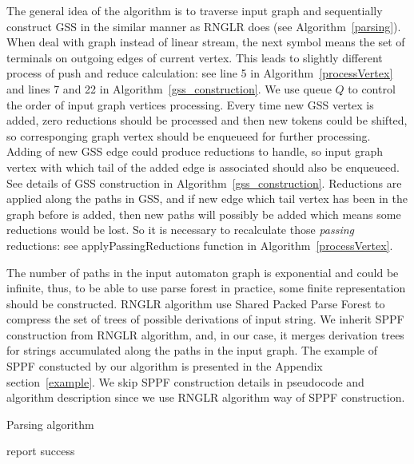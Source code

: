 The general idea of the algorithm is to traverse input graph and sequentially construct GSS
in the similar manner as RNGLR does (see Algorithm~\ref{parsing}). When deal with graph instead of linear stream,
the next symbol means the set of terminals on outgoing edges of current vertex.
This leads to slightly different process of push and reduce calculation: 
see line 5 in Algorithm~\ref{processVertex} and lines 7 and 22 in Algorithm~\ref{gss_construction}. 
We use queue $Q$ to control the order of input graph vertices processing. 
Every time new GSS vertex is added, zero reductions should be processed 
and then new tokens could be shifted, so corresponging graph vertex should be 
enqueueed for further processing. Adding of new GSS edge could produce reductions 
to handle, so input graph vertex with which tail of the added edge is associated should 
also be enqueueed. See details of GSS construction in Algorithm~\ref{gss_construction}. 
Reductions are applied along the paths in GSS, and if new edge 
which tail vertex has been in the graph before is added, then new paths will possibly 
be added which means some reductions would be lost. So it is necessary to recalculate 
those \emph{passing} reductions: see applyPassingReductions function in Algorithm~\ref{processVertex}.

The number of paths in the input automaton graph is exponential and could be infinite,
thus, to be able to use parse forest in practice, some finite representation should 
be constructed. RNGLR algorithm use Shared Packed Parse Forest to compress the set 
of trees of possible derivations of input string. We inherit SPPF construction from 
RNGLR algorithm, and, in our case, it merges derivation trees for strings accumulated 
along the paths in the input graph. The example of SPPF constucted by our algorithm is
presented in the Appendix section~\ref{example}. We skip SPPF construction details in 
pseudocode and algorithm description since we use RNGLR algorithm way of SPPF construction.
\begin{algorithm}[!ht]
\begin{algorithmic}[1]
\caption{Parsing algorithm}
\label{parsing}
     {report success}
    \EndIf
  \Else
    \EndWhile
    \EndIf
  \EndIf
\EndFunction
\end{algorithmic}
\end{algorithm}

